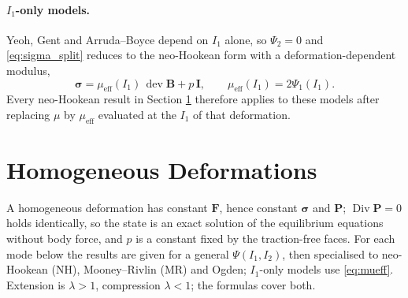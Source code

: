 \documentclass[11pt]{article}
\newcommand{\Dive}{\operatorname{Div}}
\newcommand{\dev}{\operatorname{dev}}
\newcommand{\bsig}{\bm{\sigma}}
\newcommand{\bP}{\bm{P}}
\newcommand{\bF}{\bm{F}}
\newcommand{\bB}{\bm{B}}
\newcommand{\bI}{\bm{I}}
\newcommand{\Ione}{I_1}
\newcommand{\Itwo}{I_2}
\newcommand{\Pone}{\Psi_{1}}
\newcommand{\Ptwo}{\Psi_{2}}
\begin{document}
\paragraph{$\Ione$-only models.}
Yeoh, Gent and Arruda--Boyce depend on $\Ione$ alone, so $\Ptwo = 0$ and
\eqref{eq:sigma_split} reduces to the neo-Hookean form with a
deformation-dependent modulus,
\begin{equation}
  \bsig = \mu_{\mathrm{eff}}(\Ione)\,\dev\bB + p\,\bI, \qquad
  \mu_{\mathrm{eff}}(\Ione) = 2\Pone(\Ione).
  \label{eq:mueff}
\end{equation}
Every neo-Hookean result in Section \ref{sec:homogeneous} therefore
applies to these models after replacing $\mu$ by
$\mu_{\mathrm{eff}}$ evaluated at the $\Ione$ of that deformation.

\section{Homogeneous Deformations}
\label{sec:homogeneous}

A homogeneous deformation has constant $\bF$, hence constant $\bsig$ and
$\bP$; $\Dive\bP = 0$ holds identically, so the state is an exact solution
of the equilibrium equations without body force, and $p$ is a constant
fixed by the traction-free faces.  For each mode below the results are
given for a general $\Psi(\Ione,\Itwo)$, then specialised to neo-Hookean
(NH), Mooney--Rivlin (MR) and Ogden; $\Ione$-only models use
\eqref{eq:mueff}.  Extension is $\lambda > 1$, compression $\lambda < 1$;
the formulas cover both.
\end{document}
